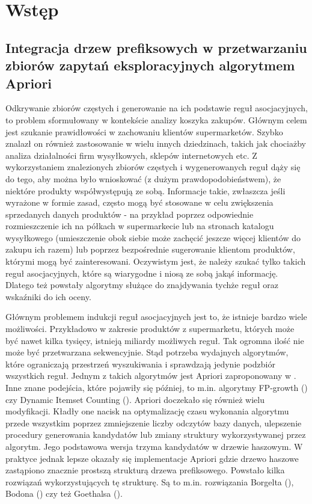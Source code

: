 \chapter{Wstęp}
\label{c1}

\section{Integracja drzew prefiksowych w przetwarzaniu zbiorów zapytań eksploracyjnych algorytmem Apriori}
\label{c11}


Odkrywanie zbiorów częstych i generowanie na ich podstawie reguł asocjacyjnych, to problem sformułowany w kontekście analizy koszyka zakupów. Głównym celem jest szukanie prawidłowości w zachowaniu klientów supermarketów. Szybko znalazł on również zastosowanie w wielu innych dziedzinach, takich jak chociażby analiza działalności firm wysyłkowych, sklepów internetowych etc. Z wykorzystaniem znalezionych zbiorów częstych i wygenerowanych reguł dąży się do tego, aby można było wnioskować (z dużym prawdopodobieństwem), że niektóre produkty współwystępują ze sobą. Informacje takie, zwłaszcza jeśli wyrażone w formie zasad, często mogą być stosowane w celu zwiększenia sprzedanych danych produktów - na przykład poprzez odpowiednie rozmieszczenie ich na półkach w supermarkecie lub na stronach katalogu wysyłkowego (umieszczenie obok siebie może zachęcić jeszcze więcej klientów do zakupu ich razem) lub poprzez bezpośrednie sugerowanie klientom produktów, którymi mogą być zainteresowani. Oczywistym jest, że należy szukać tylko takich reguł asocjacyjnych, które są wiarygodne i niosą ze sobą jakąś informację. Dlatego też powstały algorytmy służące do znajdywania tychże reguł oraz wskaźniki do ich oceny.

Głównym problemem indukcji reguł asocjacyjnych jest to, że istnieje bardzo wiele możliwości. Przykładowo w zakresie produktów z supermarketu, których może być nawet kilka tysięcy, istnieją miliardy możliwych reguł. Tak ogromna ilość nie może być przetwarzana sekwencyjnie. Stąd potrzeba wydajnych algorytmów, które ograniczają przestrzeń wyszukiwania i sprawdzają jedynie podzbiór wszystkich reguł. Jednym z takich algorytmów jest Apriori zaproponowany w \cite{Agrawal}. Inne znane podejścia, które pojawiły się później, to m.in. algorytmy FP-growth (\cite{Han}) czy Dynamic Itemset Counting (\cite{Brin}). Apriori doczekało się również wielu modyfikacji. Kładły one nacisk na optymalizację czasu wykonania algorytmu przede wszystkim poprzez zmniejszenie liczby odczytów bazy danych, ulepszenie procedury generowania kandydatów lub zmiany struktury wykorzystywanej przez algorytm. Jego podstawowa wersja trzyma kandydatów w drzewie haszowym. W praktyce jednak lepsze okazały się implementacje Apriori gdzie drzewo haszowe zastąpiono znacznie prostszą strukturą drzewa prefiksowego. Powstało kilka rozwiązań wykorzystujących tę strukturę. Są to m.in. rozwiązania Borgelta (\cite{Borgelt}), Bodona (\cite{Bodon}) czy też Goethalsa (\cite{Goethals}).


